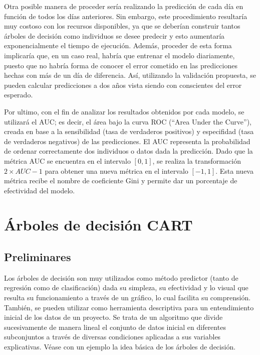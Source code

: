 \documentclass[12pt,twoside]{article}
\begin{document}
Otra posible manera de proceder sería realizando la predicción de cada día en función de todos los días anteriores. Sin embargo, este procedimiento resultaría muy costoso con los recursos disponibles, ya que se deberían construir tantos árboles de decisión como individuos se desee predecir y esto aumentaría exponencialmente el tiempo de ejecución. Además, proceder de esta forma implicaría que, en un caso real, habría que entrenar el modelo diariamente, puesto que no habría forma de conocer el error cometido en las predicciones hechas con más de un día de diferencia. Así, utilizando la validación propuesta, se pueden calcular predicciones a dos años vista siendo con conscientes del error esperado.

Por ultimo, con el fin de analizar los resultados obtenidos por cada modelo, se utilizará el AUC; es decir, el área bajo la curva ROC (``Area Under the Curve''), creada en base a la sensibilidad (tasa de  verdaderos positivos) y especifidad (tasa de verdaderos negativos) de las predicciones. El AUC representa la probabilidad de ordenar correctamente dos individuos o datos dada la predicción. Dado que la métrica AUC se encuentra en el intervalo $[0,1]$, se realiza la transformación  $2 \times AUC - 1$ para obtener una nueva métrica en el intervalo $[-1,1]$. Esta nueva métrica recibe el nombre de coeficiente Gini y permite dar un porcentaje de efectividad del modelo.



\newpage



\section{Árboles de decisión CART}
\subsection{Preliminares}

Los árboles de decisión son muy utilizados como método predictor (tanto de regresión como de clasificación) dada su simpleza, su efectividad y lo visual que resulta su funcionamiento a través de un gráfico, lo cual facilita su comprensión. También, se pueden utilizar como herramienta descriptiva para un entendimiento inicial de los datos de un proyecto. Se trata de un algoritmo que divide sucesivamente de manera lineal el conjunto de datos inicial en diferentes subconjuntos a través de diversas condiciones aplicadas a sus variables explicativas. Véase con un ejemplo la idea básica de los árboles de decisión.
\end{document}
